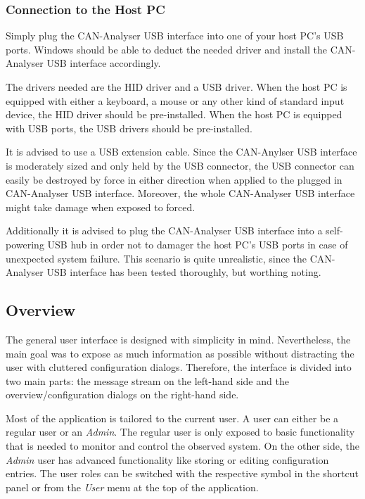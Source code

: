 \documentclass[12pt,a4paper]{scrartcl}
\begin{document}
\subsubsection{Connection to the Host PC}
\label{subsubsec:GettingStartedEstablishConnectionConnectionToHost}
Simply plug the CAN-Analyser USB interface into one of your host PC's USB ports. Windows should be able to deduct the needed driver and install the CAN-Analyser USB interface accordingly. 

The drivers needed are the HID driver and a USB driver. When the host PC is equipped with either a keyboard, a mouse or any other kind of standard input device, the HID driver should be pre-installed. When the host PC is equipped with USB ports, the USB drivers should be pre-installed. 

It is advised to use a USB extension cable. Since the CAN-Anylser USB interface is moderately sized and only held by the USB connector, the USB connector can easily be destroyed by force in either direction when applied to the plugged in CAN-Analyser USB interface. Moreover, the whole CAN-Analyser USB interface might take damage when exposed to forced.

Additionally it is advised to plug the CAN-Analyser USB interface into a self-powering USB hub in order not to damager the host PC's USB ports in case of unexpected system failure. This scenario is quite unrealistic, since the CAN-Analyser USB interface has been tested thoroughly, but worthing noting.

\subsection{Overview}
\label{subsec:GettingStartedOverview}
The general user interface is designed with simplicity in mind. Nevertheless, the main goal was to expose as much information as possible without distracting the user with cluttered configuration dialogs. Therefore, the interface is divided into two main parts: the message stream on the left-hand side and the overview/configuration dialogs on the right-hand side. 

Most of the application is tailored to the current user. A user can either be a regular user or an \textit{Admin}. The regular user is only exposed to basic functionality that is needed to monitor and control the observed system. On the other side, the \textit{Admin} user has advanced functionality like storing or editing configuration entries. The user roles can be switched with the respective symbol in the shortcut panel or from the \textit{User} menu at the top of the application.
\end{document}
